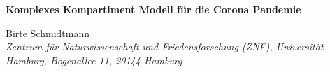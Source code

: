 \documentclass[twoside]{article}
\begin{document}

\begin{center}
\textbf{\Large Komplexes Kompartiment Modell f\"ur die Corona Pandemie}
\end{center}



\begin{center}
Birte Schmidtmann\\%
{\small{%
\emph{Zentrum f\"ur Naturwissenschaft und Friedensforschung (ZNF), Universit\"at Hamburg, Bogenallee 11, 20144 Hamburg}}}
\end{center}


\bigskip

\end{document}
